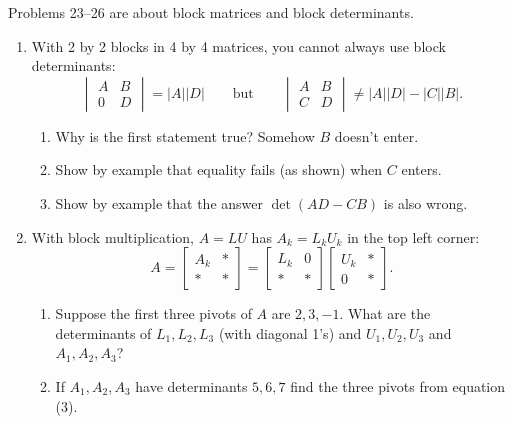 \documentclass[14pt, a4paper]{article}
\begin{document}
\noindent Problems 23--26 are about block matrices and block determinants.

\begin{enumerate}[resume]
    \item With 2 by 2 blocks in 4 by 4 matrices, you cannot always use block determinants:
          \[
              \begin{vmatrix} A & B \\ 0 & D \end{vmatrix} = |A||D| \qquad \text{but} \qquad
              \begin{vmatrix} A & B \\ C & D \end{vmatrix} \neq |A||D| - |C||B|.
          \]
          \begin{enumerate}
              \item Why is the first statement true? Somehow $B$ doesn't enter.
              \item Show by example that equality fails (as shown) when $C$ enters.
              \item Show by example that the answer $\det(AD - CB)$ is also wrong.
          \end{enumerate}

    \item With block multiplication, $A = LU$ has $A_k = L_k U_k$ in the top left corner:
          \[
              A = \begin{bmatrix} A_k & * \\ * & * \end{bmatrix} =
              \begin{bmatrix} L_k & 0 \\ * & * \end{bmatrix} \begin{bmatrix} U_k & * \\ 0 & * \end{bmatrix} .
          \]
          \begin{enumerate}
              \item Suppose the first three pivots of $A$ are $2, 3, -1$. What are the determinants of $L_1, L_2, L_3$ (with diagonal 1's) and $U_1, U_2, U_3$ and $A_1, A_2, A_3$?
              \item If $A_1, A_2, A_3$ have determinants $5, 6, 7$ find the three pivots from equation (3).
          \end{enumerate}


\end{enumerate}
\end{document}
